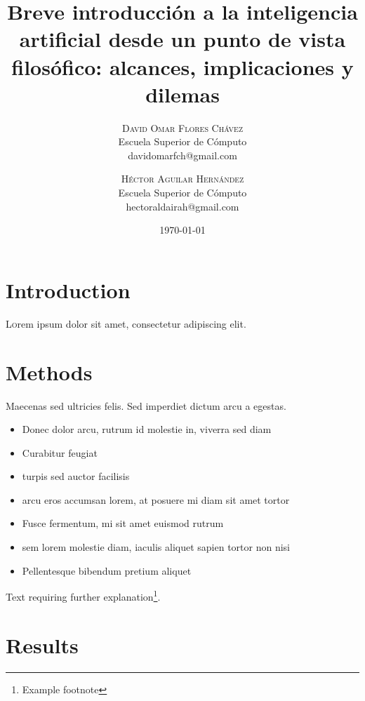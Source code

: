 \documentclass[twoside,twocolumn]{article}
\title{Breve introducción a la inteligencia artificial desde un punto
        de vista filosófico: alcances, implicaciones y dilemas} %
\author{
    \textsc{David Omar Flores Chávez} \\[1ex] %
    \normalsize Escuela Superior de Cómputo \\ %
    \normalsize {davidomarfch@gmail.com} %
    \and %
    \textsc{Héctor Aguilar Hernández} \\[1ex] %
    \normalsize Escuela Superior de Cómputo \\ %
    \normalsize {hectoraldairah@gmail.com} %
}
\date{\today} %
\begin{document}
\maketitle

\section{Introduction}

\lettrine[nindent=0em,lines=3]{L} orem ipsum dolor sit amet, consectetur adipiscing elit.
\blindtext %

\blindtext %


\section{Methods}

    Maecenas sed ultricies felis. Sed imperdiet dictum arcu a egestas. 

    \begin{itemize}
        \item Donec dolor arcu, rutrum id molestie in, viverra sed diam
        \item Curabitur feugiat
        \item turpis sed auctor facilisis
        \item arcu eros accumsan lorem, at posuere mi diam sit amet tortor
        \item Fusce fermentum, mi sit amet euismod rutrum
        \item sem lorem molestie diam, iaculis aliquet sapien tortor non nisi
        \item Pellentesque bibendum pretium aliquet
    \end{itemize}

    \blindtext %

    Text requiring further explanation\footnote{Example footnote}.


\section{Results}
\end{document}
